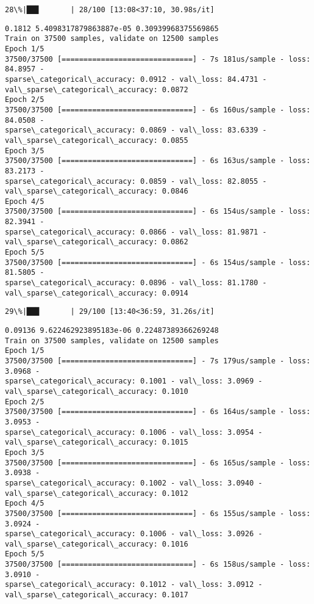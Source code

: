 \documentclass[11pt]{article}
\begin{document}
    \begin{Verbatim}[commandchars=\\\{\}]
 28\%|██▊       | 28/100 [13:08<37:10, 30.98s/it]
    \end{Verbatim}

    \begin{Verbatim}[commandchars=\\\{\}]
0.1812 5.4098317879863887e-05 0.30939968375569865
Train on 37500 samples, validate on 12500 samples
Epoch 1/5
37500/37500 [==============================] - 7s 181us/sample - loss: 84.8957 -
sparse\_categorical\_accuracy: 0.0912 - val\_loss: 84.4731 -
val\_sparse\_categorical\_accuracy: 0.0872
Epoch 2/5
37500/37500 [==============================] - 6s 160us/sample - loss: 84.0508 -
sparse\_categorical\_accuracy: 0.0869 - val\_loss: 83.6339 -
val\_sparse\_categorical\_accuracy: 0.0855
Epoch 3/5
37500/37500 [==============================] - 6s 163us/sample - loss: 83.2173 -
sparse\_categorical\_accuracy: 0.0859 - val\_loss: 82.8055 -
val\_sparse\_categorical\_accuracy: 0.0846
Epoch 4/5
37500/37500 [==============================] - 6s 154us/sample - loss: 82.3941 -
sparse\_categorical\_accuracy: 0.0866 - val\_loss: 81.9871 -
val\_sparse\_categorical\_accuracy: 0.0862
Epoch 5/5
37500/37500 [==============================] - 6s 154us/sample - loss: 81.5805 -
sparse\_categorical\_accuracy: 0.0896 - val\_loss: 81.1780 -
val\_sparse\_categorical\_accuracy: 0.0914
    \end{Verbatim}

    \begin{Verbatim}[commandchars=\\\{\}]
 29\%|██▉       | 29/100 [13:40<36:59, 31.26s/it]
    \end{Verbatim}

    \begin{Verbatim}[commandchars=\\\{\}]
0.09136 9.622462923895183e-06 0.22487389366269248
Train on 37500 samples, validate on 12500 samples
Epoch 1/5
37500/37500 [==============================] - 7s 179us/sample - loss: 3.0968 -
sparse\_categorical\_accuracy: 0.1001 - val\_loss: 3.0969 -
val\_sparse\_categorical\_accuracy: 0.1010
Epoch 2/5
37500/37500 [==============================] - 6s 164us/sample - loss: 3.0953 -
sparse\_categorical\_accuracy: 0.1006 - val\_loss: 3.0954 -
val\_sparse\_categorical\_accuracy: 0.1015
Epoch 3/5
37500/37500 [==============================] - 6s 165us/sample - loss: 3.0938 -
sparse\_categorical\_accuracy: 0.1002 - val\_loss: 3.0940 -
val\_sparse\_categorical\_accuracy: 0.1012
Epoch 4/5
37500/37500 [==============================] - 6s 155us/sample - loss: 3.0924 -
sparse\_categorical\_accuracy: 0.1006 - val\_loss: 3.0926 -
val\_sparse\_categorical\_accuracy: 0.1016
Epoch 5/5
37500/37500 [==============================] - 6s 158us/sample - loss: 3.0910 -
sparse\_categorical\_accuracy: 0.1012 - val\_loss: 3.0912 -
val\_sparse\_categorical\_accuracy: 0.1017
    \end{Verbatim}
\end{document}
